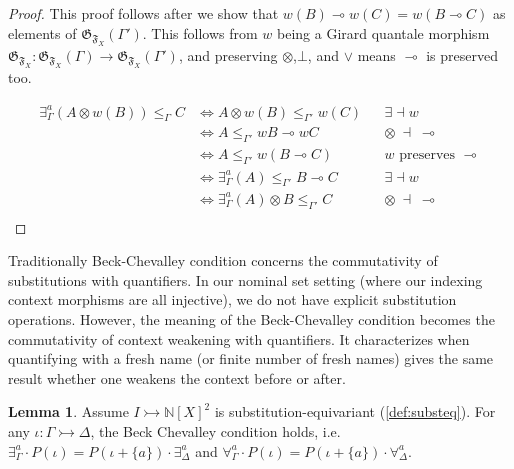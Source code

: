 \documentclass{article}
\theoremstyle{definition}
\newtheorem{lemma}{Lemma}[section]
\newcommand{\N}{\mathbb{N}}
\newcommand{\F}{\mathfrak{F}}
\newcommand{\G}{\mathfrak{G}}
\begin{document}
\begin{proof}
    This proof follows after we show that $w(B)\multimap w(C) = w(B \multimap C)$ as elements of $\G_{\F_X}(\Gamma')$. This follows from $w$ being a Girard quantale morphism $\G_{\F_X}\colon \G_{\F_X}(\Gamma)\to \G_{\F_X}(\Gamma')$, and preserving $\otimes$,$\bot$, and $\vee$ means $\multimap$ is preserved too.

    \begin{align*}
        \exists^a_\Gamma(A \otimes w(B))\leq_{\Gamma} C &\iff A \otimes w(B) \leq_{\Gamma'} w(C) && \exists \dashv w\\
        &\iff A \leq_{\Gamma'} wB \multimap wC && \otimes\  \dashv\ \multimap \\
        &\iff A \leq_{\Gamma'} w(B \multimap C) && w \text{ preserves }\multimap \\
        &\iff \exists^a_\Gamma(A) \leq_{\Gamma'} B \multimap C && \exists \dashv w\\
        &\iff \exists^a_\Gamma(A) \otimes B \leq_{\Gamma'} C && \otimes\  \dashv\ \multimap \\
    \end{align*}
\end{proof}

Traditionally Beck-Chevalley condition concerns the commutativity of substitutions with quantifiers. In our nominal set setting (where our indexing context morphisms are all injective), we do not have explicit substitution operations. However, the meaning of the Beck-Chevalley condition becomes the commutativity of context weakening with quantifiers. It characterizes when quantifying with a fresh name (or finite number of fresh names) gives the same result whether one weakens the context before or after. 

\begin{lemma}
    \label{lemma:beck}
    Assume  $I\rightarrowtail \N[X]^2$ is substitution-equivariant (\cref{def:substeq}). For any $\iota\colon \Gamma\rightarrowtail \Delta$, the Beck Chevalley condition holds, i.e. $\exists^{a}_\Gamma \cdot P(\iota) = P(\iota+\{a\}) \cdot \exists^{a}_\Delta$ and $\forall^{a}_\Gamma \cdot P(\iota) = P(\iota+\{a\}) \cdot \forall^{a}_\Delta$.
\end{lemma}
\end{document}
